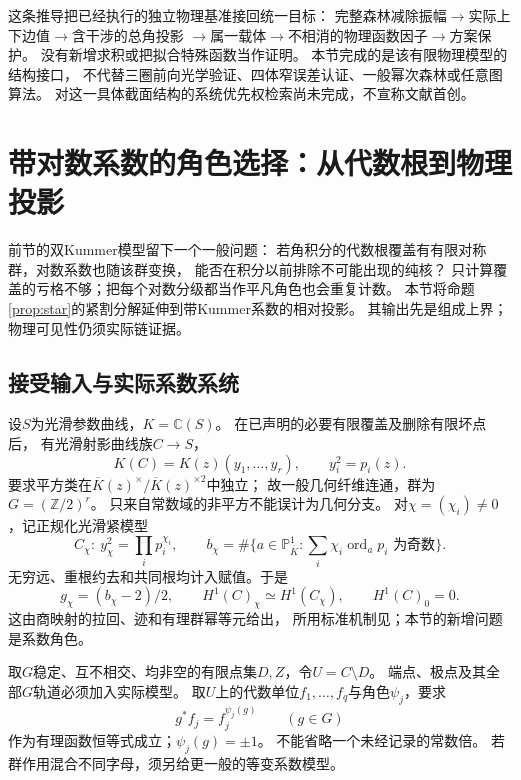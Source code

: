 \documentclass[11pt,a4paper]{ctexart}
\theoremstyle{cnplain}\newtheorem{theorem}{定理}[section]
\theoremstyle{definition}\newtheorem{definition}[theorem]{定义}
\theoremstyle{remark}\newtheorem{remark}[theorem]{注}
\begin{document}
这条推导把已经执行的独立物理基准接回统一目标：
完整森林减除振幅$\to$实际上下边值$\to$含干涉的总角投影
$\to$属一载体$\to$不相消的物理函数因子$\to$方案保护。
没有新增求积或把拟合特殊函数当作证明。
本节完成的是该有限物理模型的结构接口，
不代替三圈前向光学验证、四体窄误差认证、一般幂次森林或任意图算法。
对这一具体截面结构的系统优先权检索尚未完成，不宣称文献首创。



\section{带对数系数的角色选择：从代数根到物理投影}\label{sec:eqkummer}
前节的双Kummer模型留下一个一般问题：
若角积分的代数根覆盖有有限对称群，对数系数也随该群变换，
能否在积分以前排除不可能出现的纯核？
只计算覆盖的亏格不够；把每个对数分级都当作平凡角色也会重复计数。
本节将命题\ref{prop:star}的紧割分解延伸到带Kummer系数的相对投影。
其输出先是组成上界；物理可见性仍须实际链证据。

\subsection{接受输入与实际系数系统}
设$S$为光滑参数曲线，$K=\mathbb C(S)$。
在已声明的必要有限覆盖及删除有限坏点后，
有光滑射影曲线族$C\to S$，
\[
 K(C)=K(z)(y_1,\ldots,y_r),\qquad y_i^2=p_i(z).
\]
要求平方类在$\overline K(z)^\times/\overline K(z)^{\times2}$中独立；
故一般几何纤维连通，群为$G=(\mathbb Z/2)^r$。
只来自常数域的非平方不能误计为几何分支。
对$\chi=(\chi_i)\ne0$，记正规化光滑紧模型
\[
 C_\chi:\ y_\chi^2=\prod_i p_i^{\chi_i},\qquad
 b_\chi=\#\{a\in\mathbb P^1_{\overline K}:
             \textstyle\sum_i\chi_i\operatorname{ord}_a p_i\text{ 为奇数}\}.
\]
无穷远、重根约去和共同根均计入赋值。于是
\begin{equation}\label{eq:eqcompact}
 g_\chi=(b_\chi-2)/2,\qquad
 H^1(C)_\chi\simeq H^1(C_\chi),\qquad H^1(C)_0=0.
\end{equation}
这由商映射的拉回、迹和有理群幂等元给出，
所用标准机制见\cite{KR,CarRod}；本节的新增问题是系数角色。

取$G$稳定、互不相交、均非空的有限点集$D,Z$，令$U=C\setminus D$。
端点、极点及其全部$G$轨道必须加入实际模型。
取$U$上的代数单位$f_1,\ldots,f_q$与角色$\psi_j$，要求
\begin{equation}\label{eq:inverseunit}
 g^*f_j=f_j^{\psi_j(g)}\qquad(g\in G)
\end{equation}
作为有理函数恒等式成立；$\psi_j(g)=\pm1$。
不能省略一个未经记录的常数倍。
若群作用混合不同字母，须另给更一般的等变系数模型。
\end{document}
